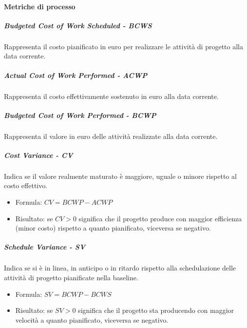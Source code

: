\paragraph{Metriche di processo}

\subparagraph{Budgeted Cost of Work Scheduled - BCWS}
Rappresenta il costo pianificato in euro per realizzare le attività di progetto alla data corrente.

\subparagraph{Actual Cost of Work Performed - ACWP}
Rappresenta il costo effettivamente sostenuto in euro alla data corrente.

\subparagraph{Budgeted Cost of Work Performed - BCWP}
Rappresenta il valore in euro delle attività realizzate alla data corrente.

\subparagraph{Cost Variance - CV}
Indica se il valore realmente maturato è maggiore, uguale o minore rispetto al costo effettivo.
\begin{itemize}
    \item Formula: $CV = BCWP - ACWP$
    \item Risultato: se $CV > 0$ significa che il progetto produce con maggior efficienza (minor costo) rispetto a quanto pianificato, viceversa se negativo.
\end{itemize}

\subparagraph{Schedule Variance - SV}
Indica se si è in linea, in anticipo o in ritardo rispetto alla schedulazione delle attività di progetto pianificate nella baseline.
\begin{itemize}
    \item Formula: $SV = BCWP - BCWS$
    \item Risultato: se $SV > 0$ significa che il progetto sta producendo con maggior velocità a quanto pianificato, viceversa se negativo.
\end{itemize}